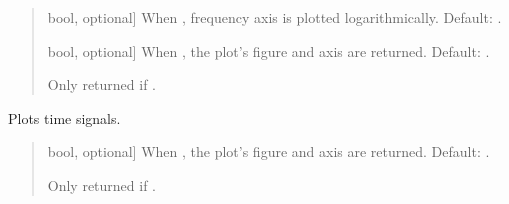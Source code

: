 \documentclass[letterpaper,10pt,english]{sphinxmanual}
\begin{document}
\begin{fulllineitems}
\begin{fulllineitems}
\begin{quote}
\begin{description}
\begin{description}
\sphinxlineitem{\sphinxstylestrong{logfreqs}}{[}bool, optional{]}
\sphinxAtStartPar
When , frequency axis is plotted logarithmically.
Default: .

\sphinxlineitem{\sphinxstylestrong{returns}}{[}bool, optional{]}
\sphinxAtStartPar
When , the plot’s figure and axis are returned.
Default: .

\end{description}

\begin{description}
\sphinxAtStartPar
Only returned if .

\end{description}

\end{description}\end{quote}

\end{fulllineitems}


\begin{fulllineitems}
\label{\detokenize{classes:dsptoolbox.classes.signal_class.Signal.plot_time}}
\pysigstartsignatures
{}
\pysigstopsignatures
\sphinxAtStartPar
Plots time signals.
\begin{quote}\begin{description}
\begin{description}
\sphinxlineitem{\sphinxstylestrong{returns}}{[}bool, optional{]}
\sphinxAtStartPar
When , the plot’s figure and axis are returned.
Default: .

\end{description}

\begin{description}
\sphinxAtStartPar
Only returned if .

\end{description}


\end{description}
\end{quote}
\end{fulllineitems}
\end{fulllineitems}
\end{document}
